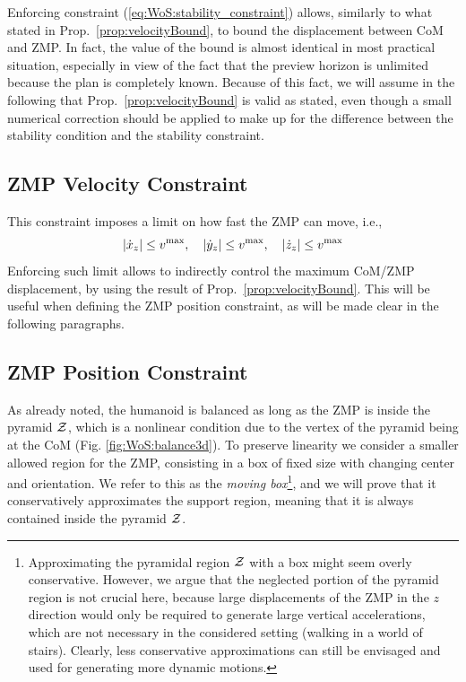 Enforcing constraint (\ref{eq:WoS:stability_constraint}) allows, similarly to what stated in Prop.~\ref{prop:velocityBound}, to bound the displacement between CoM and ZMP. In fact, the value of the bound is almost identical in most practical situation, especially in view of the fact that the preview horizon is unlimited because the plan is completely known. Because of this fact, we will assume in the following that Prop.~\ref{prop:velocityBound} is valid as stated, even though a small numerical correction should be applied to make up for the difference between the stability condition and the stability constraint.



\smallskip

\subsection{ZMP Velocity Constraint}

This constraint imposes a limit on how fast the ZMP can move, i.e.,
\begin{equation}\label{eq:WoS:ZMP_velocity_constraint}
|\dot x_z|\le v^{\rm max}, \quad |\dot y_z|\le v^{\rm max}, \quad |\dot z_z|\le v^{\rm max}
\end{equation}
Enforcing such limit allows to indirectly control the maximum CoM/ZMP displacement, by using the result of Prop.~\ref{prop:velocityBound}. This will be useful when defining the ZMP position constraint, as will be made clear in the following paragraphs.

\smallskip

\subsection{ZMP Position Constraint}
As already noted, the humanoid is balanced as long as the ZMP is inside the pyramid $\cal Z$, which is a nonlinear condition due to the vertex of the pyramid being at the CoM (Fig. \ref{fig:WoS:balance3d}). To preserve linearity we consider a smaller allowed region for the ZMP, consisting in a box of fixed size with changing center and orientation. We refer to this as the {\em moving box}\footnote{Approximating the pyramidal region $\cal Z$ with a box might seem overly conservative. However, we argue that the neglected portion of the pyramid region is not crucial here, because large displacements of the ZMP in the $z$ direction would only be required to generate large vertical accelerations, which are not necessary in the considered setting (walking in a world of stairs). Clearly, less conservative approximations can still be envisaged and used for generating more dynamic motions.}, and we will prove that it conservatively approximates the support region, meaning that it is always contained inside the pyramid $\cal Z$.



